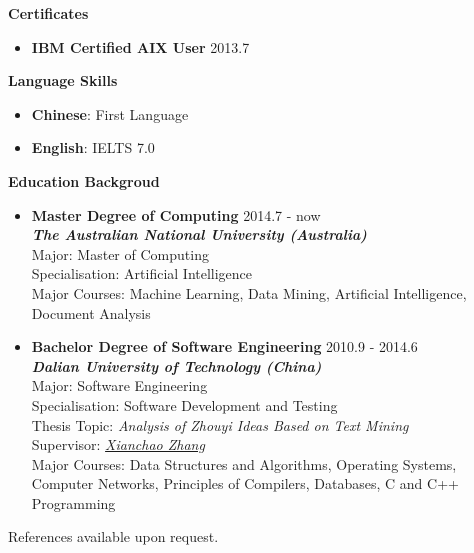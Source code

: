 \documentclass{res}
\newcommand{\resheading}[1]{{\normalsize \colorbox{mygrey}{\begin{minipage}{\textwidth}{\textbf{#1 \vphantom{p\^{E}}}}\end{minipage}}}}
\begin{document}
\begin{resume}
\begin{CJK*}{UTF8}{song}
\begin{itemize}
\end{itemize}



\resheading{Certificates}

\begin{itemize}
\itemsep -2pt %
  \item{\bf IBM Certified AIX User} \hfill 2013.7
\end{itemize}



\resheading{Language Skills}

\begin{itemize}
\itemsep -2pt %
  \item{\bf Chinese}: First Language	
  \item{\bf English}: IELTS 7.0
\end{itemize}






\resheading{Education Backgroud}

\begin{itemize}
  \item{\bf Master Degree of Computing} \hfill 2014.7 - now \\
  					  \textbf{\textit{The Australian National University (Australia)}} \\
                      Major: Master of Computing \\
                      Specialisation: Artificial Intelligence \\
                      Major Courses: Machine Learning, Data Mining, Artificial Intelligence, Document Analysis
  \item{\bf Bachelor Degree of Software Engineering}   \hfill 2010.9 - 2014.6 \\
  \textbf{\textit{Dalian University of Technology (China)}} \\
                      Major: Software Engineering\\
                      Specialisation: Software Development and Testing \\
                      Thesis Topic: \textit{Analysis of Zhouyi Ideas Based on Text Mining} \\
                      Supervisor: \href{https://sciforschenonline.org/journals/computer-science-informatics/xianchao-zhang.php}{\textit{Xianchao Zhang}} \\
                      Major Courses: Data Structures and Algorithms, Operating Systems, Computer Networks, Principles of Compilers, Databases, C and C++ Programming
\end{itemize}


References available upon request.

\end{CJK*}
\end{resume}
\end{document}
